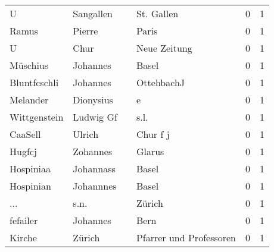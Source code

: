 \begin{tabular}{llllrr}
                        U &                          Sangallen &             &                                  St. Gallen &          0 &         1 \\
                    Ramus &                             Pierre &             &                                       Paris &          0 &         1 \\
                        U &                               Chur &             &                                Neue Zeitung &          0 &         1 \\
                 Müschius &                           Johannes &             &                                       Basel &          0 &         1 \\
             Bluntfcschli &                           Johannes &             &                                  OttehbachJ &          0 &         1 \\
                 Melander &                          Dionysius &             &                                           e &          0 &         1 \\
             Wittgenstein &                          Ludwig Gf &             &                                        s.l. &          0 &         1 \\
                  CaaSell &                             Ulrich &             &                                    Chur f j &          0 &         1 \\
                   Hugfcj &                           Zohannes &             &                                      Glarus &          0 &         1 \\
                Hospiniaa &                          Johannass &             &                                       Basel &          0 &         1 \\
                Hospinian &                          Johannnes &             &                                       Basel &          0 &         1 \\
                      ... &                               s.n. &             &                                      Zürich &          0 &         1 \\
                 fefailer &                           Johannes &             &                                        Bern &          0 &         1 \\
                   Kirche &                             Zürich &             &                     Pfarrer und Professoren &          0 &         1 \\

\end{tabular}
